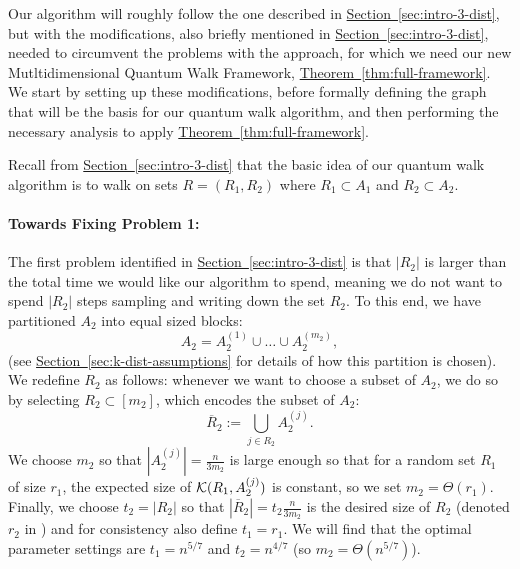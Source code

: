 \documentclass{article}
\renewcommand{\sec}[1]{\hyperref[sec:#1]{Section~\ref*{sec:#1}}}
\newcommand{\thm}[1]{\hyperref[thm:#1]{Theorem~\ref*{thm:#1}}}
\renewcommand{\>}{\rangle}
\newcommand{\<}{\langle}
\renewcommand{\(}{\left(}
\renewcommand{\)}{\right)}
\begin{document}
Our algorithm will roughly follow the one described in \sec{intro-3-dist}, but with the modifications, also briefly mentioned in \sec{intro-3-dist}, needed to circumvent the problems with the approach, for which we need our new Mutltidimensional Quantum Walk Framework, \thm{full-framework}. We start by setting up these modifications, before formally defining the graph that will be the basis for our quantum walk algorithm, and then performing the necessary analysis to apply \thm{full-framework}.

\vskip10pt

Recall from \sec{intro-3-dist} that the basic idea of our quantum walk algorithm is to walk on sets $R = (R_1,R_2)$ where $R_1\subset A_1$ and $R_2\subset A_2$. 

\paragraph{Towards Fixing Problem 1:} The first problem identified in \sec{intro-3-dist} is that $|R_2|$ is larger than the total time we would like our algorithm to spend, meaning we do not want to spend $|R_2|$ steps sampling and writing down the set $R_2$. To this end, we have partitioned $A_2$ into equal sized blocks:
$$A_2=A_2^{(1)}\cup\dots\cup A_2^{(m_2)},$$
(see \sec{k-dist-assumptions} for details of how this partition is chosen). We redefine $R_2$ as follows: whenever we want to choose a subset of $A_2$, we do so by selecting $R_2\subset [m_2]$, which encodes the subset of $A_2$:
$$\overline{R}_2:=\bigcup_{j\in R_2} A_2^{(j)}.$$
We choose $m_2$ so that $|A_2^{(j)}|=\frac{n}{3m_2}$ is large enough so that for a random set $R_1$ of size $r_1$, the expected size of ${\cal K}({R}_1,A_2^{(j)})$ is constant, so we set $m_2=\Theta(r_1)$. Finally, we choose $t_2=|R_2|$ so that $|\overline{R}_2|=t_2\frac{n}{3m_2}$ is the desired size of $R_2$ (denoted $r_2$ in \cite{belovs2012kDist}) and for consistency also define $t_1 = r_1$. We will find that the optimal parameter settings are $t_1=n^{5/7}$ and $t_2=n^{4/7}$ (so $m_2=\Theta(n^{5/7})$). 
\end{document}
